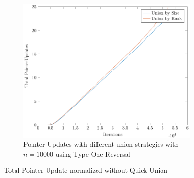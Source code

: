 \begin{figure}[ht]
\begin{subfigure}{0.32\textwidth}
    \end{subfigure}%
    \hfill
    \begin{subfigure}{0.32\textwidth}
        \centering
        \includegraphics[width=\textwidth]{../images/plotTORNonFull10000_PointerUpdates.pdf}
        \caption{Pointer Updates with different union strategies with $n = 10000$ using Type One Reversal}
    \end{subfigure}

    \caption{Total Pointer Update normalized without Quick-Union}
    \label{fig:tpuNH}
\end{figure}
